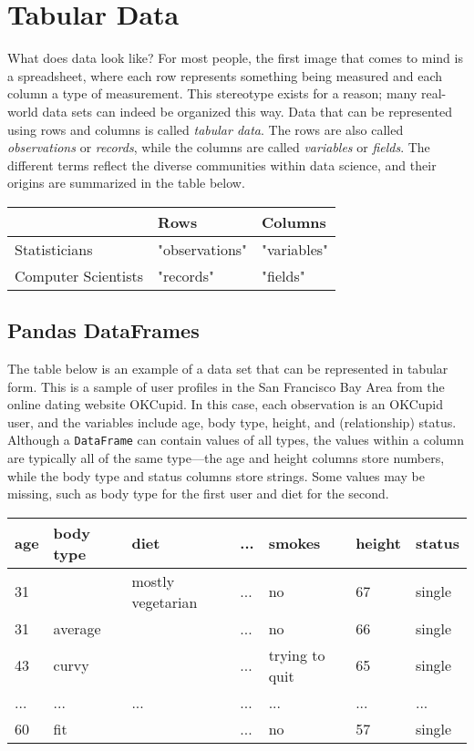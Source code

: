 

\chapter{Tabular Data}\label{Ch.1}

What does data look like? For most people, the first image that comes to mind is a spreadsheet, where each row represents something being measured and each column a type of measurement. This stereotype exists for a reason; many real-world data sets can indeed be organized this way. Data that can be represented using rows and columns is called \textit{tabular data}. The rows are also called \textit{observations} or \textit{records},  while the columns are called \textit{variables} or \textit{fields}. The different terms reflect the diverse communities within data science, and their origins are summarized in the table below.
\begin{tabular}{l l l}
 & Rows & Columns \\
\hline
Statisticians & "observations" & "variables" \\
Computer Scientists & "records" & "fields" \\
\end{tabular}

\section{Pandas DataFrames}\label{1.1}

The table below is an example of a
data set that can be represented in tabular form.
This is a sample of user profiles in the
San Francisco Bay Area from the online dating website
OKCupid. In this case, each observation is an OKCupid user, and the variables include age, body type, height, and
(relationship) status. Although a
\verb|DataFrame| can contain values of all types, the
values within a column are typically all of the same
type---the age and height columns store
numbers, while the body type and
status columns store strings. Some values may be missing, such as body type for the first user
and diet for the second.
\begin{tabular}{l l l l l l l}
age & body type & diet & ... & smokes & height & status \\
\hline
31 &  & mostly vegetarian & ... & no & 67 & single \\
31 & average &  & ... & no & 66 & single \\
43 & curvy &  & ... & trying to quit & 65 & single \\
... & ... & ... & ... & ... & ... & ... \\
60 & fit &  & ... & no & 57 & single \\
\end{tabular}

